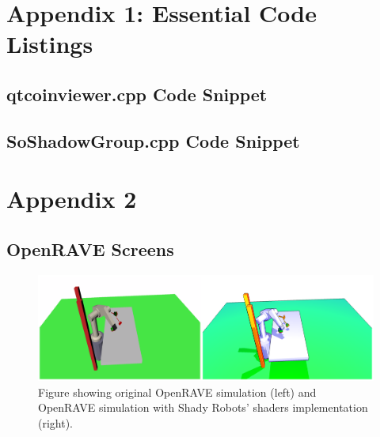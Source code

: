 \documentclass[10pt,journal,compsoc,draftclsnofoot]{IEEEtran}
\begin{document}
\begin{flushleft}
\newpage

\section{Appendix 1: Essential Code Listings}

\subsection{qtcoinviewer.cpp Code Snippet}


\newpage

\subsection{SoShadowGroup.cpp Code Snippet}


\newpage

\section{Appendix 2}
\subsection{OpenRAVE Screens}
\begin{figure} [H]
  \includegraphics[scale=0.8]{beforeAfter_1.eps}
  \caption
{ \newline \hspace{\linewidth}
Figure showing original OpenRAVE simulation (left) and OpenRAVE simulation with Shady Robots' shaders implementation (right).}
  \label{fig:beforeafter}
\end{figure}

\end{flushleft}
\end{document}
